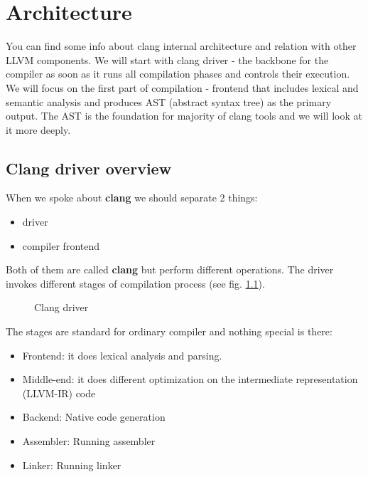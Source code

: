 \chapter{Architecture}

You can find some info about clang internal architecture and relation with other
LLVM components. We will start with clang driver - the backbone for the
compiler as soon as it runs all compilation phases and controls their
execution. We will focus on the first part of compilation - frontend that
includes lexical and semantic analysis and produces AST (abstract syntax tree)
as the primary output. The AST is the foundation for majority of clang tools and
we will look at it more deeply. 

\section{Clang driver overview}

When we spoke about \textbf{clang} we should separate 2 things:
\begin{itemize}
\item driver
\item compiler frontend 
\end{itemize}
Both of them are called \textbf{clang} but perform different
operations. The driver invokes different stages of compilation process
(see fig. \ref{fig:clang_driver}). 
\begin{figure}
\begin{center}
\end{center}
  \caption{Clang driver}
  \label{fig:clang_driver}
\end{figure}
The stages are standard for ordinary compiler and nothing special is
there:
\begin{itemize}
\item Frontend: it does lexical analysis and parsing.
\item Middle-end: it does different optimization on the intermediate
  representation (LLVM-IR) code
\item Backend: Native code generation
\item Assembler: Running assembler
\item Linker: Running linker
\end{itemize}

